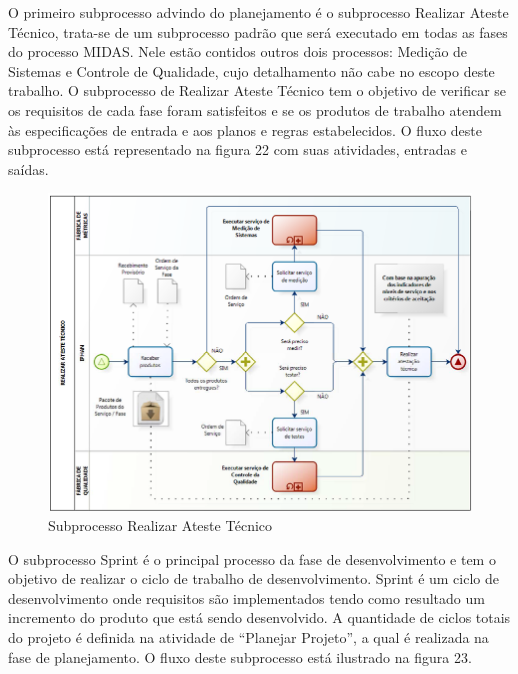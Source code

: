 \begin{anexosenv}
O primeiro subprocesso advindo do planejamento é o subprocesso Realizar Ateste Técnico, trata-se de um subprocesso padrão que será executado em todas as fases do processo MIDAS. Nele estão contidos outros dois processos: Medição de Sistemas e Controle de Qualidade, cujo detalhamento não cabe no escopo deste trabalho. O subprocesso de Realizar Ateste Técnico tem o objetivo de verificar se os requisitos de cada fase foram satisfeitos e se os produtos de trabalho atendem às especificações de entrada e aos planos e regras estabelecidos. O fluxo deste subprocesso está representado na figura 22 com suas atividades, entradas e saídas.

\begin{figure}[h]
		\centering
		\label{fig01}
			\includegraphics[scale=0.7]{figuras/subprocessoAteste.png}
		\caption{Subprocesso Realizar Ateste Técnico \cite{IPHAN:2013}}
\end{figure}

O subprocesso Sprint é o principal processo da fase de desenvolvimento e tem o objetivo de realizar o ciclo de trabalho de desenvolvimento. Sprint é um ciclo de desenvolvimento onde requisitos são implementados tendo como resultado um incremento do produto que está sendo desenvolvido. A quantidade de ciclos totais do projeto é definida na atividade de “Planejar Projeto”, a qual é realizada na fase de planejamento. O fluxo deste subprocesso está ilustrado na figura 23.



\end{anexosenv}
